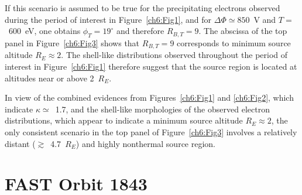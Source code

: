   If this scenario is assumed to be true for the precipitating electrons
  observed during the period of interest in Figure~\ref{ch6:Fig1}, and for
  $\Delta \Phi \simeq 850$~V and $T =$~600~eV, one obtains $\phi_T = 19^\circ$
  and therefore $R_{B,T} = 9$. The abscissa of the top panel in
  Figure~\ref{ch6:Fig3} shows that $R_{B,T} = 9$ corresponds to minimum source
  altitude $R_E \approx 2$.
  The shell-like distributions observed throughout the period of interest in
  Figure~\ref{ch6:Fig1} therefore suggest that the source region is
  located at altitudes near or above 2~$R_E$.

  In view of the combined evidences from Figures~\ref{ch6:Fig1} and
  \ref{ch6:Fig2}, which indicate $\kappa \simeq$~1.7, and the shell-like
  morphologies of the observed electron distributions, which appear to indicate
  a minimum source altitude $R_E \approx 2$, the only consistent scenario in the
  top panel of Figure~\ref{ch6:Fig3} involves a relatively distant
  ($\gtrsim$~4.7~$R_E$) and highly nonthermal source region.





  
  \section{FAST Orbit 1843}


